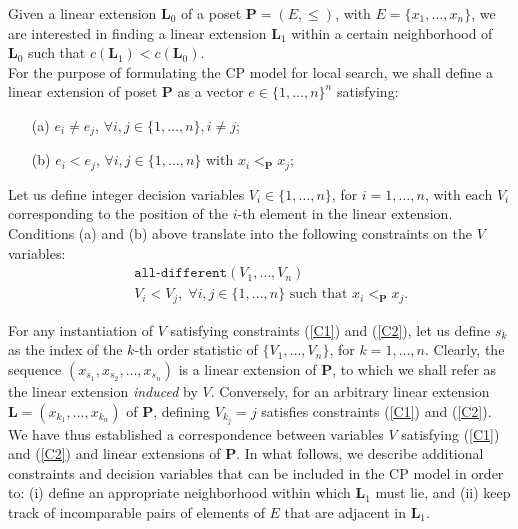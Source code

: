 \documentclass{llncs}
\begin{document}
Given a linear extension $\mathbf{L}_0$ of a poset ${\mathbf P}=(E,\leq)$, with $E=\{x_1,\ldots,x_n\}$, we are interested in finding a linear extension $\mathbf{L}_1$ within a certain neighborhood of $\mathbf{L}_0$ such that $c(\mathbf{L}_1) < c(\mathbf{L}_0)$.\\

For the purpose of formulating the CP model for local search, we shall define a linear extension of poset $\mathbf P$ as a vector $e \in \{1,\ldots,n\}^{n}$ satisfying:\\
\begin{itemize}
\item[(a)] $e_i \neq e_j$, $\forall i,j \in \{1,\ldots,n\}, i \neq j$;
\item[(b)] $e_i < e_j$, $\forall i,j \in \{1,\ldots,n\}$ with $x_i <_{\mathbf P} x_j$;\\
\end{itemize}

Let us define integer decision variables $V_i \in \{1,\ldots,n\}$, for $i=1,\ldots,n$, with each $V_i$ corresponding to the position of the $i$-th element in the linear extension.
Conditions (a) and (b) above translate into the following constraints on the $V$ variables:
\begin{eqnarray}
&& \texttt{all-different}(V_1,\ldots,V_n) \label{C1}\\
&& V_i < V_j, \; \forall i,j \in \{1,\ldots,n\} \mbox{ such that } x_i <_{\mathbf{P}} x_j.\label{C2}
\end{eqnarray}

For any instantiation of $V$ satisfying constraints (\ref{C1}) and (\ref{C2}), let us define $s_k$ as the index of the $k$-th order statistic of $\{V_1,\ldots,V_n\}$, for $k=1,\ldots,n$. Clearly, the sequence $\left(x_{s_1}, x_{s_2}, \ldots, x_{s_n}\right)$ is a linear extension of $\mathbf P$, to which we shall refer as the linear extension \emph{induced} by $V$. Conversely, for an arbitrary linear extension $\mathbf{L}=\left(x_{k_1},\ldots,x_{k_n}\right)$ of $\mathbf{P}$, defining $V_{k_j}=j$ satisfies constraints (\ref{C1}) and (\ref{C2}).\\

We have thus established a correspondence between variables $V$ satisfying (\ref{C1}) and (\ref{C2}) and linear extensions of $\mathbf{P}$. In what follows, we describe additional constraints and decision variables that can be included in the CP model in order to: (i) define an appropriate neighborhood within which $\mathbf{L}_1$ must lie, and (ii) keep track of incomparable pairs of elements of $E$ that are adjacent in $\mathbf{L}_1$.
\end{document}
